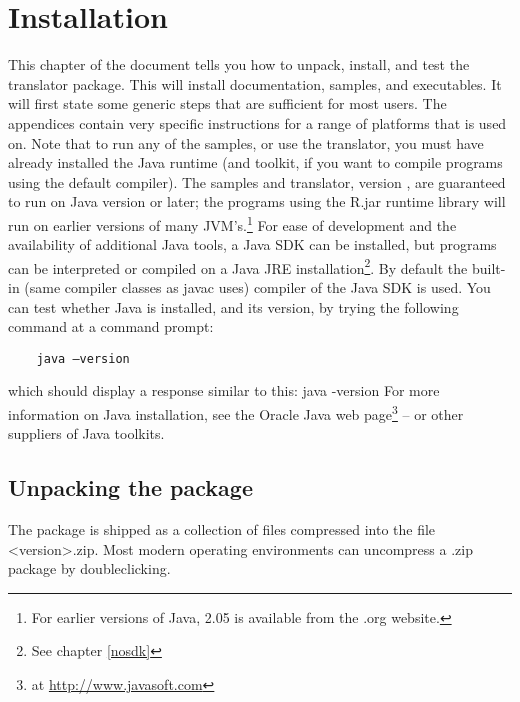 \chapter{Installation}
This chapter of the document tells you how to unpack, install, and test the \nr{} translator package. This will install documentation, samples, and executables. It will first state some generic steps that are sufficient for most users. The appendices contain very specific instructions for a range of platforms that \nr{} is used on. 
Note that to run any of the samples, or use the \nr{} translator, you must have already installed the Java runtime (and toolkit, if you want to compile \nr{} programs using the default compiler). 
The \nr{} samples and translator, version , are
guaranteed to run on Java version \minimalJVMversion{} or later; the programs using the
\nr{}R.jar runtime library will run on earlier versions of many JVM's.\footnote{For earlier versions of Java,
  \nr{} 2.05 is available from the \nr{}.org website.} For ease
of development and the availability of additional Java tools, a Java
SDK can be installed, but \nr{}
programs can be interpreted or compiled on a Java JRE
installation\footnote{See chapter \ref{nosdk}}. By
default the built-in (same compiler classes as javac uses) compiler of the Java SDK is used. You can test whether Java is installed, and its version, by trying the following command at a command prompt:
\begin{verbatim} 
    java –version
\end{verbatim}
which should display a response similar to this:
\bash[stderr]
java -version
\END
For more information on Java installation, see the Oracle Java web page\footnote{at \url{http://www.javasoft.com}} – or other suppliers of Java toolkits.

\section{Unpacking the \nr{} package}
The \nr{} package is shipped as a collection of files compressed into the file \nr{}<version>.zip. 
Most modern operating environments can uncompress a .zip package by doubleclicking.

